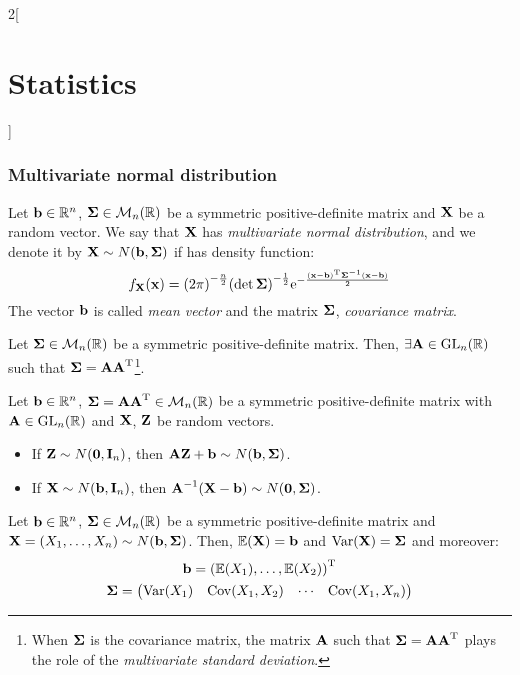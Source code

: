 \documentclass[../../../main.tex]{subfiles}
\begin{document}
\begin{multicols}{2}[\section{Statistics}]
  \subsubsection{Multivariate normal distribution}
  \begin{definition}
    Let $\vf{b}\in\RR^n$, $\vf{\Sigma}\in\mathcal{M}_n(\RR)$ be a symmetric positive-definite matrix and $\vf{X}$ be a random vector. We say that $\vf{X}$ has \emph{multivariate normal distribution}, and we denote it by $\vf{X}\sim N(\vf{b},\vf\Sigma)$ if has density function:
    $$f_{\vf{X}}(\vf{x})={(2\pi)}^{-\frac{n}{2}}{(\det\vf\Sigma)}^{-\frac{1}{2}}\exp{-\frac{\transpose{(\vf{x}-\vf{b})}{\vf\Sigma}^{-1}(\vf{x}-\vf{b})}{2}}$$
    The vector $\vf{b}$ is called \emph{mean vector} and the matrix $\vf\Sigma$, \emph{covariance matrix}.
  \end{definition}
  \begin{proposition}
    Let $\vf{\Sigma}\in\mathcal{M}_n(\RR)$ be a symmetric positive-definite matrix. Then, $\exists\vf{A}\in\GL_n(\RR)$ such that $\vf\Sigma=\vf{A}\transpose{\vf{A}}$\footnote{When $\vf\Sigma$ is the covariance matrix, the matrix $\vf{A}$ such that $\vf\Sigma=\vf{A}\transpose{\vf{A}}$ plays the role of the \emph{multivariate standard deviation}.}.
  \end{proposition}
  \begin{proposition}
    Let $\vf{b}\in\RR^n$, $\vf\Sigma=\vf{A}\transpose{\vf{A}}\in\mathcal{M}_n(\RR)$ be a symmetric positive-definite matrix with $\vf{A}\in\GL_n(\RR)$ and $\vf{X}$, $\vf{Z}$ be random vectors.
    \begin{itemize}
      \item If $\vf{Z}\sim N(\vf{0},\vf{I}_n)$, then $\vf{AZ}+\vf{b}\sim N(\vf{b},\vf\Sigma)$.
      \item If $\vf{X}\sim N(\vf{b},\vf{I}_n)$, then ${\vf{A}}^{-1}(\vf{X}-\vf{b})\sim N(\vf{0},\vf\Sigma)$.
    \end{itemize}
  \end{proposition}
  \begin{proposition}
    Let $\vf{b}\in\RR^n$, $\vf{\Sigma}\in\mathcal{M}_n(\RR)$ be a symmetric positive-definite matrix and $\vf{X}=(X_1,\ldots,X_n)\sim N(\vf{b},\vf\Sigma)$. Then, $\Exp(\vf{X})=\vf{b}$ and $\Var(\vf{X})=\vf\Sigma$ and moreover:
    \begin{gather*}
      \vf{b}=\transpose{(\Exp(X_1),\ldots,\Exp(X_2))}\\
      \vf\Sigma=
      \begin{pmatrix}
        \Var(X_1)     & \cov(X_1,X_2) & \cdots & \cov(X_1,X_n) \\

\end{pmatrix}
\end{gather*}
\end{proposition}
\end{multicols}
\end{document}
